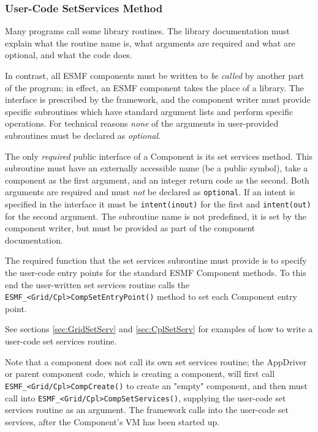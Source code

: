 %

\subsubsection{User-Code SetServices Method}

Many programs call some library routines.  The library
documentation must explain what the routine name is, what arguments 
are required and what are optional, and what the code does.  

In contrast, all ESMF components must be written to {\it be called}
by another part of the program; in effect, an ESMF component takes the 
place of a library.  The interface is prescribed by the framework,
and the component writer must provide specific subroutines which 
have standard argument lists and perform specific operations.
For technical reasons {\em none} of the arguments in user-provided subroutines
must be declared as {\em optional}.

The only {\em required} public interface of a Component is its
set services method.  This subroutine must have an
externally accessible name (be a public symbol), take a component
as the first argument, and an integer return code as the second. 
Both arguments are required and must {\em not} be declared as 
{\tt optional}. If an intent is specified in the interface it must be 
{\tt intent(inout)} for the first and {\tt intent(out)} for the 
second argument. The subroutine name is not predefined, it is set by the
component writer, but must be provided as part of the component 
documentation.

The required function that the set services subroutine must provide is to
specify the user-code entry points for the standard ESMF Component methods. To
this end the user-written set services routine calls the
{\tt ESMF\_<Grid/Cpl>CompSetEntryPoint()} method to set each 
Component entry point.

See sections \ref{sec:GridSetServ} and \ref{sec:CplSetServ} for examples of
how to write a user-code set services routine.

Note that a component does not call its own set services routine;
the AppDriver or parent component code, which is creating a component, 
will first call {\tt ESMF\_<Grid/Cpl>CompCreate()} to create an "empty" 
component, and then must call into {\tt ESMF\_<Grid/Cpl>CompSetServices()}, 
supplying the user-code set services routine as an argument. The framework
calls into the user-code set services, after the Component's VM has been
started up.


